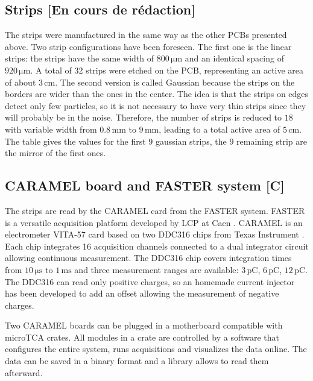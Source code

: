 \begin{refsection}
  \subsection{Strips [En cours de rédaction]}
  The strips were manufactured in the same way as the other PCBs presented above. Two strip configurations have been foreseen. The first one is the linear strips: the strips have the same width of $800\,\mathrm{\mu m}$ and an identical spacing of $920\,\mathrm{\mu m}$. A total of 32 strips were etched on the PCB, representing an active area of about $3\,\mathrm{cm}$. The second version is called Gaussian because the strips on the borders are wider than the ones in the center. The idea is that the strips on edges detect only few particles, so it is not necessary to have very thin strips since they will probably be in the noise. Therefore, the number of strips is reduced to $18$ with variable width from $0.8\,\mathrm{mm}$ to $9\,\mathrm{mm}$, leading to a total active area of $5\,\mathrm{cm}$. The table gives the values for the first $9$ gaussian strips, the $9$ remaining strip are the mirror of the first ones.

  

  \subsection{CARAMEL board and FASTER system [C]}

  The strips are read by the CARAMEL card \cite{caramel2013} from the FASTER system. FASTER is a versatile  acquisition platform developed by LCP at Caen \cite{faster2013}. CARAMEL is an electrometer VITA-57 card based on two DDC316 chips from Texas Instrument \cite{ddc316}. Each chip integrates 16 acquisition channels connected to a dual integrator circuit allowing continuous measurement. The DDC316 chip covers integration times from $10\,\mathrm{\mu s}$ to $1\,\mathrm{ms}$ and three measurement ranges are available: $3\,\mathrm{pC}$, $6\,\mathrm{pC}$, $12\,\mathrm{pC}$. The DDC316 can read only positive charges, so an homemade current injector has been developed to add an offset allowing the measurement of negative charges.
  

  Two CARAMEL boards can be plugged in a motherboard compatible with microTCA crates. All modules in a crate are controlled by a software that configures the entire system, runs acquisitions and visualizes \cite{rhb2012} the data online. The data can be saved in a binary format and a library allows to read them afterward.


\end{refsection}
